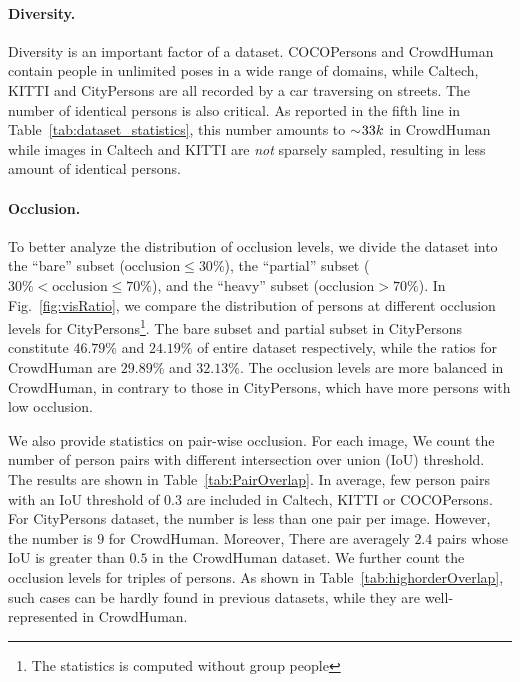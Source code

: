 \documentclass[10pt,twocolumn,letterpaper]{article}
\begin{document}
\paragraph{Diversity.}
Diversity is an important factor of a dataset. %
COCOPersons and CrowdHuman contain people in unlimited poses in a wide range of domains, while Caltech, KITTI and CityPersons are all recorded by a car traversing on streets. 
The number of identical persons is also critical. As reported in the fifth line in Table~\ref{tab:dataset_statistics}, this number amounts to $\sim\negmedspace 33k$ in CrowdHuman while images in Caltech and KITTI are \emph{not} sparsely sampled, resulting in less amount of identical persons.

\paragraph{Occlusion.}
To better analyze the distribution of occlusion levels, we divide the dataset into the ``bare'' subset ($\mathrm{occlusion} \leq 30\%$), the ``partial'' subset ($30\% < \mathrm{occlusion }\leq 70\%$), and the ``heavy'' subset ($\mathrm{occlusion} > 70\%$). In Fig.~\ref{fig:visRatio}, we compare the distribution of persons at different occlusion levels for CityPersons\footnote{The statistics is computed without group people}. The bare subset and partial subset in CityPersons constitute $46.79\%$ and $24.19\%$ of entire dataset respectively, while the ratios for CrowdHuman are $29.89\%$ and $32.13\%$. The occlusion levels are more balanced in CrowdHuman, in contrary to those in CityPersons, which have more persons with low occlusion.

We also provide statistics on pair-wise occlusion. For each image, We count the number of person pairs with different intersection over union (IoU) threshold. The results are shown in Table~\ref{tab:PairOverlap}. In average, few person pairs with an IoU threshold of $0.3$ are included in Caltech, KITTI or COCOPersons. For CityPersons dataset, the number is less than one pair per image. However, the number is $9$ for CrowdHuman. Moreover, There are averagely $2.4$ pairs whose IoU is greater than $0.5$ in the CrowdHuman dataset. We further count the occlusion levels for triples of persons. As shown in Table~\ref{tab:highorderOverlap}, such cases can be hardly found in previous datasets, while they are well-represented in CrowdHuman.
\end{document}
